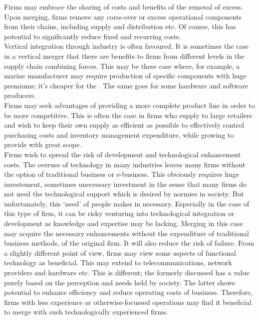 \documentclass[11pt, english]{article}
\begin{document}
        Firms may embrace the sharing of costs and benefits of the removal of excess. Upon merging, firms remove any corss-over or excess operational components from their chains, including supply and distribution etc. Of course, this has potential to significantly reduce fixed and recurring costs.\\

        Vertical integration through industry is often favoured. It is sometimes the case in a vertical merger that there are benefits to firms from different levels in the supply chain combining forces. This may be these case where, for example, a marine manufacturer may require production of specific components with huge premiums; it's cheaper for the . The same goes for some hardware and software producers.\\

        Firms may seek advantages of providing a more complete product line in order to be more competitive. This is often the case in firms who supply to large retailers and wish to keep their own supply as efficient as possible to effectively control purchasing costs and inventory management expenditure, while growing to provide with great scope.\\

        Firms wish to spread the risk of development and technological enhancement costs. The overuse of technology in many industries leaves many firms without the option of traditional business or e-business. This obviously requires huge investement, sometimes unecessary investment in the sense that many firms do not need the technological support which is desired by normies in society. But unfortunately, this `need' of people makes in necessary. Especially in the case of this type of firm, it can be risky venturing into technological integration or development as knowledge and expertise may be lacking. Merging in this case may acquire the necessary enhancements without the expenditure of traditional business methods, of the original firm. It will also reduce the risk of failure. From a slightly different point of view, firms may view some aspects of functional technology as beneficial. This may extend to telecommunications, network providers and hardware etc. This is different; the formerly discussed has a value purely based on the perception and needs held by society. The latter shows potential to enhance efficiency and reduce operating costs of business. Therefore, firms with less experience or otherwise-focussed operations may find it beneficial to merge with such technologically experienced firms.\\
\end{document}
